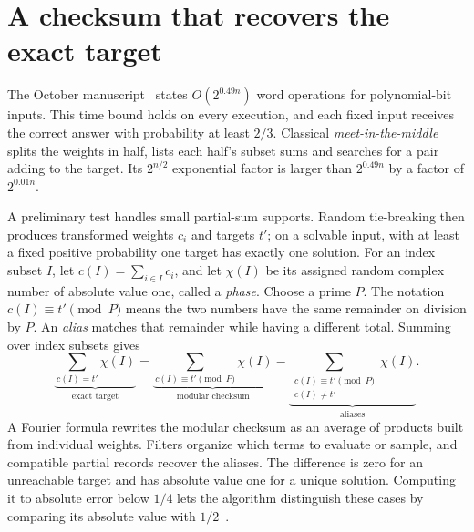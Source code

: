 \documentclass[11pt,english]{article}
\begin{document}
\section{A checksum that recovers the exact target}
The October manuscript~\cite{time} states $O(2^{0.49n})$ word operations for
polynomial-bit inputs. This time bound holds on every execution, and each
fixed input receives the correct answer with probability at least $2/3$.
Classical \emph{meet-in-the-middle} splits the weights in half, lists each
half's subset sums and searches for a pair adding to the target. Its
$2^{n/2}$ exponential factor is larger than $2^{0.49n}$ by a factor of $2^{0.01n}$.

A preliminary test handles small partial-sum supports. Random tie-breaking
then produces transformed weights $c_i$ and targets $t'$; on a solvable input,
with at least a fixed positive probability one target has exactly one solution.
For an index subset $I$, let $c(I)=\sum_{i\in I}c_i$, and let $\chi(I)$ be
its assigned random complex number of absolute value one, called a \emph{phase}.
Choose a prime $P$. The notation $c(I)\equiv t'\pmod P$ means the two numbers
have the same remainder on division by $P$. An \emph{alias} matches that
remainder while having a different total. Summing over index subsets gives
\[
 \underbrace{\sum_{c(I)=t'}\chi(I)}_{\text{exact target}}
 =\underbrace{\sum_{c(I)\equiv t'\!\!\pmod P}\chi(I)}_{\text{modular checksum}}
 -\underbrace{\sum_{\substack{c(I)\equiv t'\!\!\pmod P\\c(I)\ne t'}}\chi(I)}_{\text{aliases}}.
\]
A Fourier formula rewrites the modular checksum as an average of products
built from individual weights. Filters organize which terms to evaluate or
sample, and compatible partial records recover the aliases. The difference
is zero for an unreachable target and has absolute value one for a unique
solution. Computing it to absolute error below $1/4$ lets the algorithm
distinguish these cases by comparing its absolute value with $1/2$~\cite{time}.

\newpage
\end{document}
